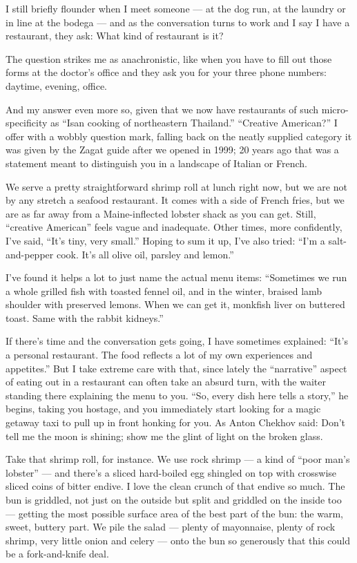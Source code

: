 I still briefly flounder when I meet someone --- at the dog run, at the
laundry or in line at the bodega --- and as the conversation turns to
work and I say I have a restaurant, they ask: What kind of restaurant is
it?

The question strikes me as anachronistic, like when you have to fill out
those forms at the doctor's office and they ask you for your three phone
numbers: daytime, evening, office.

And my answer even more so, given that we now have restaurants of such
micro-specificity as ``Isan cooking of northeastern Thailand.''
``Creative American?'' I offer with a wobbly question mark, falling back
on the neatly supplied category it was given by the Zagat guide after we
opened in 1999; 20 years ago that was a statement meant to distinguish
you in a landscape of Italian or French.

We serve a pretty straightforward shrimp roll at lunch right now, but we
are not by any stretch a seafood restaurant. It comes with a side of
French fries, but we are as far away from a Maine-inflected lobster
shack as you can get. Still, ``creative American'' feels vague and
inadequate. Other times, more confidently, I've said, ``It's tiny, very
small.'' Hoping to sum it up, I've also tried: ``I'm a salt-and-pepper
cook. It's all olive oil, parsley and lemon.''

I've found it helps a lot to just name the actual menu items:
``Sometimes we run a whole grilled fish with toasted fennel oil, and in
the winter, braised lamb shoulder with preserved lemons. When we can get
it, monkfish liver on buttered toast. Same with the rabbit kidneys.''

If there's time and the conversation gets going, I have sometimes
explained: ``It's a personal restaurant. The food reflects a lot of my
own experiences and appetites.'' But I take extreme care with that,
since lately the ``narrative'' aspect of eating out in a restaurant can
often take an absurd turn, with the waiter standing there explaining the
menu to you. ``So, every dish here tells a story,'' he begins, taking
you hostage, and you immediately start looking for a magic getaway taxi
to pull up in front honking for you. As Anton Chekhov said: Don't tell
me the moon is shining; show me the glint of light on the broken glass.

Take that shrimp roll, for instance. We use rock shrimp --- a kind of
``poor man's lobster'' --- and there's a sliced hard-boiled egg shingled
on top with crosswise sliced coins of bitter endive. I love the clean
crunch of that endive so much. The bun is griddled, not just on the
outside but split and griddled on the inside too --- getting the most
possible surface area of the best part of the bun: the warm, sweet,
buttery part. We pile the salad --- plenty of mayonnaise, plenty of rock
shrimp, very little onion and celery --- onto the bun so generously that
this could be a fork-and-knife deal.

